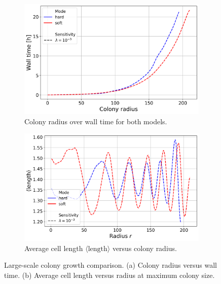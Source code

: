 \documentclass[conference]{IEEEtran}
\begin{document}
\begin{figure}[h]
    \centering
    \begin{subfigure}[b]{0.9\linewidth}
        \centering
        \includegraphics[width=\linewidth]{figures/comparison_plots/huge_wall_time_vs_radius.png}
        \caption{Colony radius over wall time for both models.}
        \label{fig:huge_wall_time_vs_radius}
    \end{subfigure}

    \begin{subfigure}[b]{0.9\linewidth}
        \centering
        \includegraphics[width=\linewidth]{figures/comparison_plots/huge_length_shared.png}
        \caption{Average cell length $\langle \text{length} \rangle$ versus colony radius.}
        \label{fig:huge_length_shared}
    \end{subfigure}

    \caption{Large-scale colony growth comparison. (a) Colony radius versus wall time. (b) Average cell length versus radius at maximum colony size.}
\end{figure}
\end{document}
